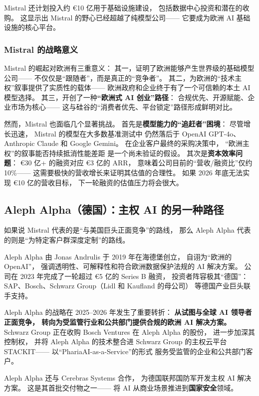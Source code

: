 Mistral 还计划投入约 €10 亿用于基础设施建设，
包括数据中心投资和潜在的收购。
这显示出 Mistral 的野心已经超越了纯模型公司——
它要成为欧洲 AI 基础设施的核心平台。

\subsubsection{Mistral 的战略意义}

Mistral 的崛起对欧洲有三重意义：
其一，证明了欧洲能够产生世界级的基础模型公司——
不仅仅是``跟随者''，而是真正的``竞争者''。
其二，为欧洲的``技术主权''叙事提供了实质性的载体——
欧洲政府和企业终于有了一个可信赖的本土 AI 模型选择。
其三，开创了一种\textbf{``欧洲式 AI 创业''路径}：
合规优先、开源赋能、企业市场为核心——
这与硅谷的``消费者优先、平台锁定''路径形成鲜明对比。

然而，Mistral 也面临几个显著挑战。
首先是\textbf{模型能力的``追赶者''困境}：
尽管增长迅速，
Mistral 的模型在大多数基准测试中
仍然落后于 OpenAI GPT-4o、Anthropic Claude 和 Google Gemini。
在企业客户最终的采购决策中，
``欧洲主权''的叙事能否持续抵消性能差距
是一个尚未验证的假设。
其次是\textbf{资本效率问题}：
€30 亿+ 的融资对应 €3 亿的 ARR，
意味着公司目前的``营收/融资比''仅约 10\%——
这需要极快的营收增长来证明其估值的合理性。
如果 2026 年底无法实现 €10 亿的营收目标，
下一轮融资的估值压力将会很大。

\subsection{Aleph Alpha（德国）：主权 AI 的另一种路径}

如果说 Mistral 代表的是``与美国巨头正面竞争''的路线，
那么 Aleph Alpha 代表的则是``为特定客户群深度定制''的路线。

Aleph Alpha 由 Jonas Andrulis 于 2019 年在海德堡创立，
自诩为``欧洲的 OpenAI''，
强调透明性、可解释性和符合欧洲数据保护法规的 AI 解决方案。
公司在 2023 年完成了一轮超过 €5 亿的 Series B 融资，
投资者阵容极其``德国''：
SAP、Bosch、Schwarz Group（Lidl 和 Kaufland 的母公司）
等德国产业巨头联手支持。

Aleph Alpha 的战略在 2025--2026 年发生了重要转折：
\textbf{从试图与全球 AI 领导者正面竞争，
转向为受监管行业和公共部门提供合规的欧洲 AI 解决方案。}
Schwarz Group 正在收购 Bosch Ventures 在 Aleph Alpha 的股份，
进一步加深其控制权，
并将 Aleph Alpha 的技术整合进
Schwarz Group 的主权云平台 STACKIT——
以``PhariaAI-as-a-Service''的形式
服务受监管的企业和公共部门客户。

Aleph Alpha 还与 Cerebras Systems 合作，
为德国联邦国防军开发主权 AI 解决方案。
这是其首批交付物之一——
将 AI 从商业场景推进到\textbf{国家安全}领域。

